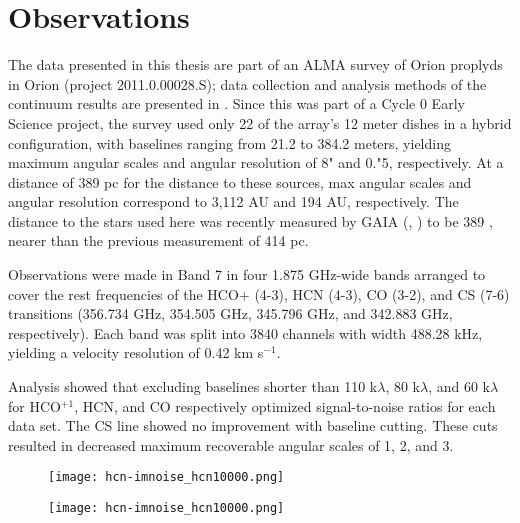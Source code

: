 \chapter{Observations}
\label{chap:observations}

The data presented in this thesis are part of an ALMA survey of Orion proplyds in Orion (project 2011.0.00028.S); data collection and analysis methods of the continuum results are presented in \citep{mann_alma_2014}. Since this was part of a Cycle 0 Early Science project, the survey used only 22 of the array's 12 meter dishes in a hybrid configuration, with baselines ranging from 21.2 to 384.2 meters, yielding maximum angular scales and angular resolution of 8" and 0."5, respectively. At a distance of 389 pc for the distance to these sources, max angular scales and angular resolution correspond to 3,112 AU and 194 AU, respectively. The distance to the stars used here was recently measured by GAIA (\citep{gaia_collaboration_gaia_2016}, \citep{gaia_collaboration_gaia_2018}) to be 389 , nearer than the previous measurement of 414 pc.

Observations were made in Band 7 in four 1.875 GHz-wide bands arranged to cover the rest frequencies of the HCO+ (4-3), HCN (4-3), CO (3-2), and CS (7-6) transitions (356.734 GHz, 354.505 GHz, 345.796 GHz, and 342.883 GHz, respectively). Each band was split into 3840 channels with width 488.28 kHz, yielding a velocity resolution of 0.42 km s$^{-1}$.



Analysis showed that excluding baselines shorter than 110 k$\lambda$, 80 k$\lambda$, and 60 k$\lambda$ for HCO$^{+1}$, HCN, and CO respectively optimized signal-to-noise ratios for each data set. The CS line showed no improvement with baseline cutting. These cuts resulted in decreased maximum recoverable angular scales of 1, 2, and 3.

\begin{figure}
\centering
\begin{minipage}{.5\textwidth}
  \centering
  \texttt{[image: hcn-imnoise\_hcn10000.png]}
  \label{fig:test1}
\end{minipage}%
\begin{minipage}{.5\textwidth}
  \centering
  \texttt{[image: hcn-imnoise\_hcn10000.png]}
  \label{fig:test2}
\end{minipage}
\end{figure}

